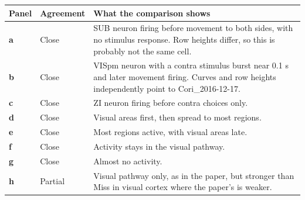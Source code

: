 \begin{longtable}{@{}p{1.1cm}p{2.5cm}p{11.8cm}@{}}
\toprule
Panel & Agreement & What the comparison shows \\
\midrule
\endhead
\textbf{a} & Close & SUB neuron firing before movement to both sides, with no stimulus response. Row heights differ, so this is probably not the same cell. \\
\textbf{b} & Close & VISpm neuron with a contra stimulus burst near 0.1 s and later movement firing. Curves and row heights independently point to Cori\_2016-12-17. \\
\textbf{c} & Close & ZI neuron firing before contra choices only. \\
\textbf{d} & Close & Visual areas first, then spread to most regions. \\
\textbf{e} & Close & Most regions active, with visual areas late. \\
\textbf{f} & Close & Activity stays in the visual pathway. \\
\textbf{g} & Close & Almost no activity. \\
\textbf{h} & Partial & Visual pathway only, as in the paper, but stronger than Miss in visual cortex where the paper's is weaker. \\
\bottomrule
\end{longtable}
